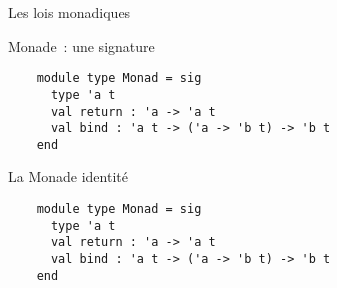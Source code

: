 \documentclass[10pt]{beamer}
\begin{document}
\begin{frame}{Les lois monadiques}
\end{frame}

\begin{frame}[fragile]{Monade~: une signature}
  \begin{verbatim}
    module type Monad = sig
      type 'a t
      val return : 'a -> 'a t
      val bind : 'a t -> ('a -> 'b t) -> 'b t
    end
  \end{verbatim}
\end{frame}

\begin{frame}[fragile]{La Monade identité}
  \begin{verbatim}
    module type Monad = sig
      type 'a t
      val return : 'a -> 'a t
      val bind : 'a t -> ('a -> 'b t) -> 'b t
    end
  \end{verbatim}
\end{frame}




\end{document}
